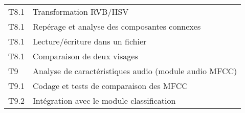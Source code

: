 \begin{tabular}{llm{1.5cm}m{1.5cm}}
	T8.1  & Transformation RVB/HSV                                                   &                      & \cs                 \\
	T8.1  & Repérage et analyse des composantes connexes                             &                      & \cs                 \\
	T8.1  & Lecture/écriture dans un fichier                                         &                      & \cs                 \\
	T8.1  & Comparaison de deux visages                                              & \cs                  &                     \\
	\hline
	T9    & \multicolumn{3}{c}{\cellcolor{LightSteelBlue} Analyse de caractéristiques audio (module audio MFCC)}                  \\
	T9.1  & Codage et tests de comparaison des MFCC                                  &                      & \cs                 \\
	T9.2  & Intégration avec le module classification                                & \cs                  &
\end{tabular}